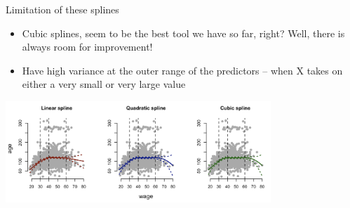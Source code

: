\documentclass[english]{beamer}
\newcommand{\alertblue}[1]{{\color{blue}#1}}
\begin{document}
\begin{frame}{Limitation of these splines}
    \begin{itemize}
        \item Cubic splines, seem to be the best tool we have so far, right? \alertblue{Well, there is always room for improvement!} 
        \vspace{0.2cm}
        \item \alertblue{Have high variance at the outer range of the
        predictors} – when X takes on either a very small or very large value
    \end{itemize}
    \vspace{0.2cm}
    \centering
    \includegraphics[width=10cm]{images/cubic_splines_issue.png}
\end{frame}
\end{document}
